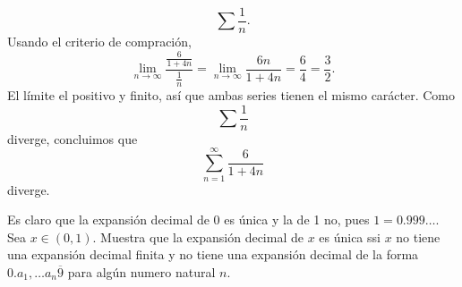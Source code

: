\documentclass[12pt,a4paper]{article}
\begin{document}
\begin{solucion}
\begin{enumerate}
            \begin{equation*}
                \sum\frac{1}{n}.
            \end{equation*}
            Usando el criterio de compración,
            \begin{equation*}
                \lim_{n\to\infty}\frac{\frac{6}{1+4n}}{\frac{1}{n}}=\lim_{n\to\infty}\frac{6n}{1+4n}=\frac{6}{4}=\frac{3}{2}.
            \end{equation*}
            El límite el positivo y finito, así que ambas series tienen el mismo carácter. Como
            \begin{equation*}
                \sum\frac{1}{n}
            \end{equation*}
            diverge, concluimos que
            \begin{equation*}
                \sum_{n=1}^{\infty}\frac{6}{1+4n}
            \end{equation*}
            diverge.
        \end{enumerate}
    \end{solucion}

    \begin{mdframed}[style=mdpinkbox,frametitle={Ejercicio 3}]
        Es claro que la expansión decimal de 0 es única y la de 1 no, pues $1=0.999\dots.$
        Sea $x\in(0,1)$. Muestra que la expansión decimal de $x$ es única ssi $x$ no tiene
        una expansión decimal finita y no tiene una expansión decimal de la forma $0.a_{1},\dots a_{n}\overline{9}$
        para algún numero natural $n$.
    \end{mdframed}
\end{document}
